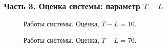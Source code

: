 \documentclass[pdf, 9pt,intlimits, unicode]{beamer}
\begin{document}
	\begin{frame}
		\frametitle{Часть 3. Оценка системы: параметр $ T - L $}
		\begin{figure}[!hhh]
			\caption{Работы системы. Оценка, $ T - L = 10 $.}
			\label{pic:system_estimation_t=70}
		\end{figure}
		
		\begin{figure}[!hhh]
			\caption{Работы системы. Оценка, $ T - L = 70 $.}
			\label{pic:system_estimation_t=130}
		\end{figure}
	\end{frame}
	
	
	
\end{document}
